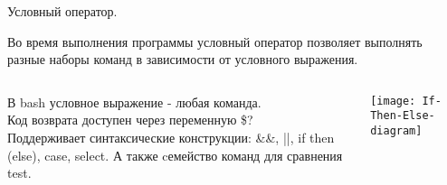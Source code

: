 \begin{frame}[fragile]{Условный оператор.}

Во время выполнения программы условный оператор позволяет выполнять разные наборы команд в зависимости от условного выражения.
\begin{columns}

В bash условное выражение - любая \alert{команда}. \\

Код возврата доступен через переменную \alert{\$?} \\

Поддерживает синтаксические конструкции: \alert{\&\&}, \alert{||}, \alert{if then (else)}, \alert{case}, \alert{select}.
А также cемейство команд для сравнения \alert{test}.

\center\texttt{[image: If-Then-Else-diagram]}

 \end{columns}
    
\end{frame}
